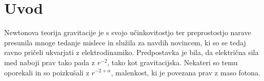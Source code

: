 \documentclass[a4paper, 12 pt, titlepage]{article}
\begin{document}
\tableofcontents

\pagebreak

\section{Uvod}

Newtonova teorija gravitacije je s svojo učinkovitostjo ter preprostostjo narave presunila mnoge tedanje mislece in
služila za navdih novincem, ki so se tedaj ravno pričeli ukvarjati z elektrodinamiko. Predpostavka je bila, da
električna sila med naboji prav tako pada z $r^{-2}$, tako kot gravitacijska. Nekateri so temu oporekali in so poizkušali
z $r^{-2 + \alpha}$, malenkost, ki je povezana prav z maso fotona.
\end{document}
